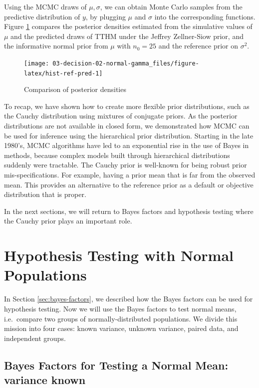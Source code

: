 \documentclass[]{book}
\theoremstyle{definition}
\theoremstyle{definition}
\theoremstyle{definition}
\theoremstyle{remark}
\begin{document}
Using the MCMC draws of \(\mu, \sigma\), we can obtain Monte Carlo
samples from the predictive distribution of \(y\), by plugging \(\mu\)
and \(\sigma\) into the corresponding functions. Figure
\ref{fig:hist-ref-pred} compares the posterior densities estimated from
the simulative values of \(\mu\) and the predicted draws of TTHM under
the Jeffrey Zellner-Siow prior, and the informative normal prior from
\(\mu\) with \(n_0 = 25\) and the reference prior on \(\sigma^2\).

\begin{figure}

{\centering \texttt{[image: 03-decision-02-normal-gamma\_files/figure-latex/hist-ref-pred-1]} 

}

\caption{Comparison of posterior densities}\label{fig:hist-ref-pred}
\end{figure}

To recap, we have shown how to create more flexible prior distributions,
such as the Cauchy distribution using mixtures of conjugate priors. As
the posterior distributions are not available in closed form, we
demonstrated how MCMC can be used for inference using the hierarchical
prior distribution. Starting in the late 1980's, MCMC algorithms have
led to an exponential rise in the use of Bayes in methods, because
complex models built through hierarchical distributions suddenly were
tractable. The Cauchy prior is well-known for being robust prior
mis-specifications. For example, having a prior mean that is far from
the observed mean. This provides an alternative to the reference prior
as a default or objective distribution that is proper.

In the next sections, we will return to Bayes factors and hypothesis
testing where the Cauchy prior plays an important role.

\section{Hypothesis Testing with Normal
Populations}\label{hypothesis-testing-with-normal-populations}

In Section \ref{sec:bayes-factors}, we described how the Bayes factors
can be used for hypothesis testing. Now we will use the Bayes factors to
test normal means, i.e.~compare two groups of normally-distributed
populations. We divide this mission into four cases: known variance,
unknown variance, paired data, and independent groups.

\subsection{Bayes Factors for Testing a Normal Mean: variance
known}\label{sec:known-var}
\end{document}
